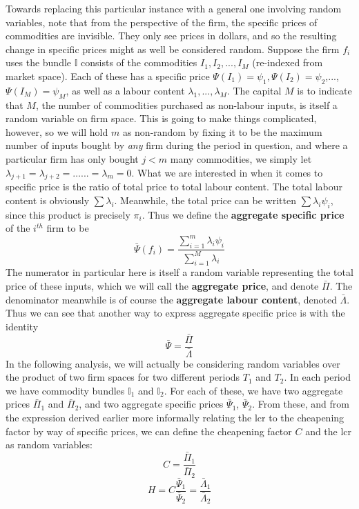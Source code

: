 \documentclass{article}
\theoremstyle{definition}
\theoremstyle{plain}
\theoremstyle{theorem}
\begin{document}
Towards replacing this particular instance with a general one involving random variables, note that from the perspective of the firm, the specific prices of commodities are invisible. They only see prices in dollars, and so the resulting change in specific prices might as well be considered random. Suppose the firm $f_i$ uses the bundle $\mathbb{I}$ consists of the commodities $I_1,I_2,...,I_M$ (re-indexed from market space). Each of these has a specific price $\Psi(I_1) = \psi_1, \Psi(I_2) = \psi_2$,...,$\Psi(I_M) = \psi_M$, as well as a labour content $\lambda_1,...,\lambda_M$. The capital $M$ is to indicate that $M$, the number of commodities purchased as non-labour inputs, is itself a random variable on firm space. This is going to make things complicated, however, so we will hold $m$ as non-random by fixing it to be the maximum number of inputs bought by \textit{any} firm during the period in question, and where a particular firm has only bought $j < m$ many commodities, we simply let $\lambda_{j+1}= \lambda_{j+2} = \ldots... = \lambda_m = 0$.  What we are interested in when it comes to specific price is the ratio of total price to total labour content. The total labour content is obviously $\sum \lambda_i$. Meanwhile, the total price can be written $\sum \lambda_i \psi_i$, since this product is precisely $\pi_i$. Thus we define the \textbf{aggregate specific price} of the $i^{th}$ firm to be
 \[ \bar{\Psi}(f_i) = \frac{\sum_{i=1}^m \lambda_i \psi_i}{\sum_{i=1}^M \lambda_i} \]
The numerator in particular here is itself a random variable representing the total price of these inputs, which we will call the \textbf{aggregate price}, and denote $\bar{\Pi}$. The denominator meanwhile is of course the \textbf{aggregate labour content}, denoted $\bar{\Lambda}$. Thus we can see that another way to express aggregate specific price is with the identity 
\[\bar{\Psi} = \frac{\bar{\Pi}}{\bar{\Lambda}} \]
In the following analysis, we will actually be considering random variables over the product of two firm spaces for two different periods $T_1$ and $T_2$. In each period we have commodity bundles $\mathbb{I}_1$ and $\mathbb{I}_2$. For each of these, we have two aggregate prices $\bar{\Pi}_1$ and $\bar{\Pi}_2$, and two aggregate specific prices $\bar{\Psi}_1$, $\bar{\Psi}_2$. From these, and from the expression derived earlier more informally relating the lcr to the cheapening factor by way of specific prices, we can define the cheapening factor $C$ and the lcr as random variables:
\[ C = \frac{\bar{\Pi}_1}{\bar{\Pi}_2} \]
\[ H = C \frac{\bar{\Psi}_1}{\bar{\Psi}_2} = \frac{\bar{\Lambda}_1}{\bar{\Lambda}_2} \]
\end{document}
